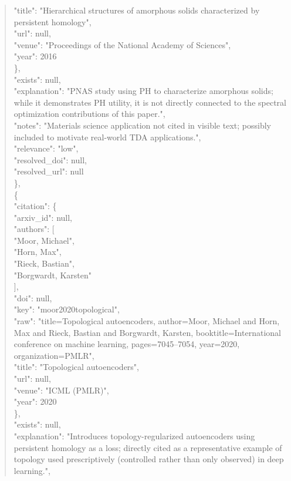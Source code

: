 \documentclass[11pt]{article}
\begin{document}
\begin{quote}
        "title": "Hierarchical structures of amorphous solids characterized by persistent homology",\\
        "url": null,\\
        "venue": "Proceedings of the National Academy of Sciences",\\
        "year": 2016\\
      \},\\
      "exists": null,\\
      "explanation": "PNAS study using PH to characterize amorphous solids; while it demonstrates PH utility, it is not directly connected to the spectral optimization contributions of this paper.",\\
      "notes": "Materials science application not cited in visible text; possibly included to motivate real-world TDA applications.",\\
      "relevance": "low",\\
      "resolved\_doi": null,\\
      "resolved\_url": null\\
    \},\\
    \{\\
      "citation": \{\\
        "arxiv\_id": null,\\
        "authors": [\\
          "Moor, Michael",\\
          "Horn, Max",\\
          "Rieck, Bastian",\\
          "Borgwardt, Karsten"\\
        ],\\
        "doi": null,\\
        "key": "moor2020topological",\\
        "raw": "title=Topological autoencoders, author=Moor, Michael and Horn, Max and Rieck, Bastian and Borgwardt, Karsten, booktitle=International conference on machine learning, pages=7045--7054, year=2020, organization=PMLR",\\
        "title": "Topological autoencoders",\\
        "url": null,\\
        "venue": "ICML (PMLR)",\\
        "year": 2020\\
      \},\\
      "exists": null,\\
      "explanation": "Introduces topology-regularized autoencoders using persistent homology as a loss; directly cited as a representative example of topology used prescriptively (controlled rather than only observed) in deep learning.",\\

\end{quote}
\end{document}
